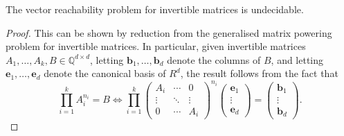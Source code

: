\begin{theorem}
The vector reachability problem for invertible matrices is undecidable.
\end{theorem}

\begin{proof}
This can be shown by reduction from the generalised matrix powering problem for invertible matrices. In particular, given invertible matrices $A_{1}, \ldots, A_{k}, B \in \mathbb{Q}^{d \times d}$, letting $\boldsymbol{b}_{1}, \ldots, \boldsymbol{b}_{d}$ denote the columns of $B$, and letting $\boldsymbol{e}_{1}, \ldots, \boldsymbol{e}_{d}$ denote the canonical basis of $R^{d}$, the result follows from the fact that
    \begin{equation*}
        \prod\limits_{i=1}^{k} A_{i}^{n_{i}} = B \Leftrightarrow
        \prod\limits_{i=1}^{k}
        \begin{pmatrix}
            A_{i} & \cdots & 0 \\
            \vdots& \ddots & \vdots \\
            0 & \cdots & A_{i}
        \end{pmatrix}^{n_{i}}
        \begin{pmatrix}
            \boldsymbol{e}_{1} \\
            \vdots \\
            \boldsymbol{e}_{d}
        \end{pmatrix} =
        \begin{pmatrix}
            \boldsymbol{b}_{1} \\
            \vdots \\
            \boldsymbol{b}_{d}
        \end{pmatrix}.
    \end{equation*}
\end{proof}
